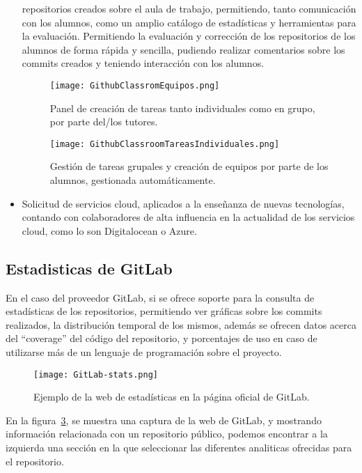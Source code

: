 \begin{itemize}
  repositorios creados sobre el aula de trabajo, permitiendo, tanto
  comunicación con los alumnos, como un amplio catálogo de estadísticas y
  herramientas para la evaluación. Permitiendo la evaluación y corrección de los repositorios de los alumnos de forma rápida y sencilla, pudiendo realizar comentarios sobre los commits creados y teniendo interacción con los alumnos.
  \begin{figure}[h!]
    \texttt{[image: GithubClassromEquipos.png]}
    \caption{Panel de creación de tareas tanto individuales como en grupo, por parte del/los tutores.}
    \label{figure:GitHubClassroomTareas}
  \end{figure}
  \begin{figure}[h!]
    \texttt{[image: GithubClassroomTareasIndividuales.png]}
    \caption{Gestión de tareas grupales y creación de equipos por parte de los alumnos, gestionada automáticamente.}
    \label{figure:GitHubClassroomEquipos}
  \end{figure}

\item Solicitud de servicios cloud, aplicados a la enseñanza de nuevas
  tecnologías, contando con colaboradores de alta influencia en la
  actualidad de los servicios cloud, como lo son Digitalocean o Azure.
\end{itemize}

\subsection{Estadisticas de GitLab}

En el caso del proveedor GitLab, si se ofrece soporte para la consulta de
estadísticas de los repositorios, permitiendo ver gráficas sobre los
commits realizados, la distribución temporal de los mismos, además se
ofrecen datos acerca del ``coverage'' del código del repositorio, y
porcentajes de uso en caso de utilizarse más de un lenguaje de programación
sobre el proyecto.

\begin{figure}[h!]
  \texttt{[image: GitLab-stats.png]}
  \caption{Ejemplo de la web de estadísticas en la página oficial de
    GitLab.}
  \label{figure:GitLabInsights}
\end{figure}

En la figura~\ref{figure:GitLabInsights}, se muestra una captura de la web
de GitLab, y mostrando información relacionada con un repositorio público,
podemos encontrar a la izquierda una sección en la que seleccionar las
diferentes analiticas ofrecidas para el repositorio.

